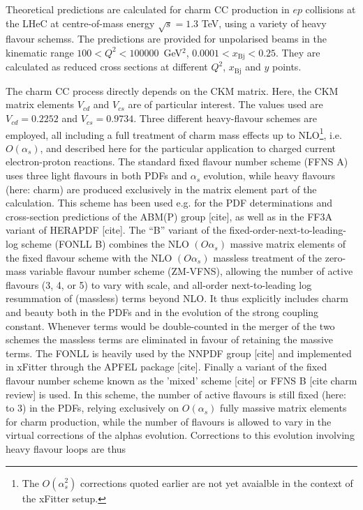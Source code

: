\documentclass[pdftex,twocolumn,epjc3]{svjour3}          %
\newcommand{\xbj}{\ensuremath{x_{\text{Bj}}}\xspace}
\begin{document}
Theoretical predictions are calculated for charm CC production in $ep$ collisions at the LHeC at centre-of-mass energy $\sqrt{s} = 1.3$ TeV, using a variety 
of heavy flavour schemss. The predictions are provided for unpolarised beams in the kinematic range $100 < Q^2 < 100000$~GeV$^2$, $0.0001 < \xbj < 0.25$. They are calculated as reduced cross sections at different $Q^2$, \xbj and $y$ points.

The charm CC process directly depends on the CKM matrix. Here, the CKM matrix 
elements $V_{cd}$ and $V_{cs}$ are of particular interest. The values used are 
$V_{cd} = 0.2252$ and $V_{cs} = 0.9734$.
Three different heavy-flavour schemes are employed, all including a full 
treatment of charm mass effects up to NLO\footnote{The $O(\alpha_s^2)$ 
corrections quoted earlier are not yet avaialble in the context of the xFitter 
setup.}, i.e. $O(\alpha_s)$, and described here for the particular application 
to charged current electron-proton reactions. 
The standard fixed flavour number scheme (FFNS A) 
uses three light flavours in both PDFs and $\alpha_s$ evolution, while heavy 
flavours (here: charm) are produced exclusively in the matrix element part of 
the calculation. This scheme has been used e.g. for the PDF determinations 
and cross-section predictions of the ABM(P) group [cite], as well as in the 
FF3A variant of HERAPDF [cite]. The ``B'' variant of the 
fixed-order-next-to-leading-log scheme (FONLL B) combines the NLO 
$(O \alpha_s)$ massive matrix elements of the fixed flavour scheme with the 
NLO $(O \alpha_s)$ massless treatment of the zero-mass variable flavour number 
scheme (ZM-VFNS), allowing the number of active flavours (3, 4, or 5) to vary 
with scale, and all-order next-to-leading log resummation of (massless) terms 
beyond NLO. 
It thus explicitly includes charm and beauty both in the PDFs and in the 
evolution of the strong coupling constant.
Whenever terms would be double-counted in the merger of the two schemes
the massless terms are eliminated in favour of retaining the massive terms.  
The FONLL is heavily used by the NNPDF group [cite] and implemented in 
xFitter through the APFEL package [cite]. 
Finally a variant of the fixed flavour number scheme known as the 'mixed' 
scheme [cite] or FFNS B [cite charm review] is used. In this scheme, the 
number of active flavours is still fixed (here: to 3) in the PDFs, relying 
exclusively on $O(\alpha_s)$ fully massive matrix elements for charm 
production, while the number of flavours is allowed to vary in the virtual 
corrections of the alphas evolution. 
Corrections to this evolution involving heavy flavour loops are thus
\end{document}
